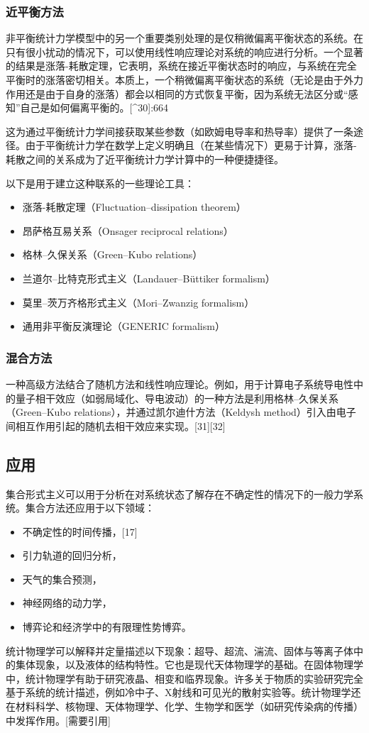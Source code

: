 \subsubsection{近平衡方法}
非平衡统计力学模型中的另一个重要类别处理的是仅稍微偏离平衡状态的系统。在只有很小扰动的情况下，可以使用线性响应理论对系统的响应进行分析。一个显著的结果是涨落-耗散定理，它表明，系统在接近平衡状态时的响应，与系统在完全平衡时的涨落密切相关。本质上，一个稍微偏离平衡状态的系统（无论是由于外力作用还是由于自身的涨落）都会以相同的方式恢复平衡，因为系统无法区分或“感知”自己是如何偏离平衡的。[^30]:664

这为通过平衡统计力学间接获取某些参数（如欧姆电导率和热导率）提供了一条途径。由于平衡统计力学在数学上定义明确且（在某些情况下）更易于计算，涨落-耗散之间的关系成为了近平衡统计力学计算中的一种便捷捷径。

以下是用于建立这种联系的一些理论工具：
\begin{itemize}
\item 涨落-耗散定理（Fluctuation–dissipation theorem）
\item 昂萨格互易关系（Onsager reciprocal relations）
\item 格林–久保关系（Green–Kubo relations）
\item 兰道尔–比特克形式主义（Landauer–Büttiker formalism）
\item 莫里–茨万齐格形式主义（Mori–Zwanzig formalism）
\item 通用非平衡反演理论（GENERIC formalism）
\end{itemize}
\subsubsection{混合方法}
一种高级方法结合了随机方法和线性响应理论。例如，用于计算电子系统导电性中的量子相干效应（如弱局域化、导电波动）的一种方法是利用格林–久保关系（Green–Kubo relations），并通过凯尔迪什方法（Keldysh method）引入由电子间相互作用引起的随机去相干效应来实现。[31][32]
\subsection{应用}
集合形式主义可以用于分析在对系统状态了解存在不确定性的情况下的一般力学系统。集合方法还应用于以下领域：
\begin{itemize}
\item 不确定性的时间传播，[17]
\item 引力轨道的回归分析，
\item 天气的集合预测，
\item 神经网络的动力学，
\item 博弈论和经济学中的有限理性势博弈。
\end{itemize}
统计物理学可以解释并定量描述以下现象：超导、超流、湍流、固体与等离子体中的集体现象，以及液体的结构特性。它也是现代天体物理学的基础。在固体物理学中，统计物理学有助于研究液晶、相变和临界现象。许多关于物质的实验研究完全基于系统的统计描述，例如冷中子、X射线和可见光的散射实验等。统计物理学还在材料科学、核物理、天体物理学、化学、生物学和医学（如研究传染病的传播）中发挥作用。[需要引用]

